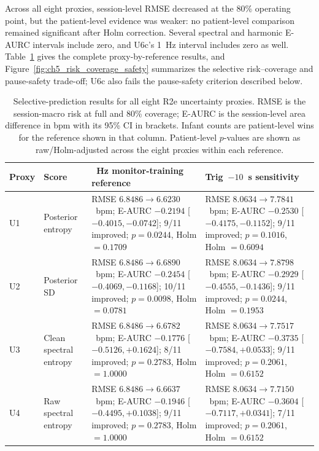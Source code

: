 Across all eight proxies, session-level RMSE decreased at the 80\% operating point, but the patient-level evidence was weaker: no patient-level comparison remained significant after Holm correction. Several spectral and harmonic E-AURC intervals include zero, and U6c's 1~Hz interval includes zero as well. Table~\ref{tab:ch5_selective_results} gives the complete proxy-by-reference results, and Figure~\ref{fig:ch5_risk_coverage_safety} summarizes the selective risk--coverage and pause-safety trade-off; U6c also fails the pause-safety criterion described below.

\begin{table}[htbp]
\centering
\scriptsize
\setlength{\tabcolsep}{4pt}
\caption{Selective-prediction results for all eight R2e uncertainty proxies. RMSE is the session-macro risk at full and 80\% coverage; E-AURC is the session-level area difference in bpm with its 95\% CI in brackets. Infant counts are patient-level wins for the reference shown in that column. Patient-level $p$-values are shown as raw/Holm-adjusted across the eight proxies within each reference.}
\label{tab:ch5_selective_results}
\begin{tabularx}{\textwidth}{@{}>{\raggedright\arraybackslash}p{0.8cm}>{\raggedright\arraybackslash}p{2.35cm}>{\raggedright\arraybackslash}X >{\raggedright\arraybackslash}X@{}}
\toprule
Proxy & Score & 1~Hz monitor-training reference & Trig~$-10$~s sensitivity \\
\midrule
U1 & Posterior entropy & RMSE $6.8486 \rightarrow 6.6230$~bpm; E-AURC $-0.2194$ [$-0.4015,-0.0742$]; 9/11 improved; $p=0.0244$, Holm $=0.1709$ & RMSE $8.0634 \rightarrow 7.7841$~bpm; E-AURC $-0.2530$ [$-0.4175,-0.1152$]; 9/11 improved; $p=0.1016$, Holm $=0.6094$ \\
\addlinespace[2pt]
U2 & Posterior SD & RMSE $6.8486 \rightarrow 6.6890$~bpm; E-AURC $-0.2454$ [$-0.4069,-0.1168$]; 10/11 improved; $p=0.0098$, Holm $=0.0781$ & RMSE $8.0634 \rightarrow 7.8798$~bpm; E-AURC $-0.2929$ [$-0.4555,-0.1436$]; 9/11 improved; $p=0.0244$, Holm $=0.1953$ \\
\addlinespace[2pt]
U3 & Clean spectral entropy & RMSE $6.8486 \rightarrow 6.6782$~bpm; E-AURC $-0.1776$ [$-0.5126,+0.1624$]; 8/11 improved; $p=0.2783$, Holm $=1.0000$ & RMSE $8.0634 \rightarrow 7.7517$~bpm; E-AURC $-0.3735$ [$-0.7584,+0.0533$]; 9/11 improved; $p=0.2061$, Holm $=0.6152$ \\
\addlinespace[2pt]
U4 & Raw spectral entropy & RMSE $6.8486 \rightarrow 6.6637$~bpm; E-AURC $-0.1946$ [$-0.4495,+0.1038$]; 9/11 improved; $p=0.2783$, Holm $=1.0000$ & RMSE $8.0634 \rightarrow 7.7150$~bpm; E-AURC $-0.3604$ [$-0.7117,+0.0341$]; 7/11 improved; $p=0.2061$, Holm $=0.6152$ \\

\end{tabularx}
\end{table}
